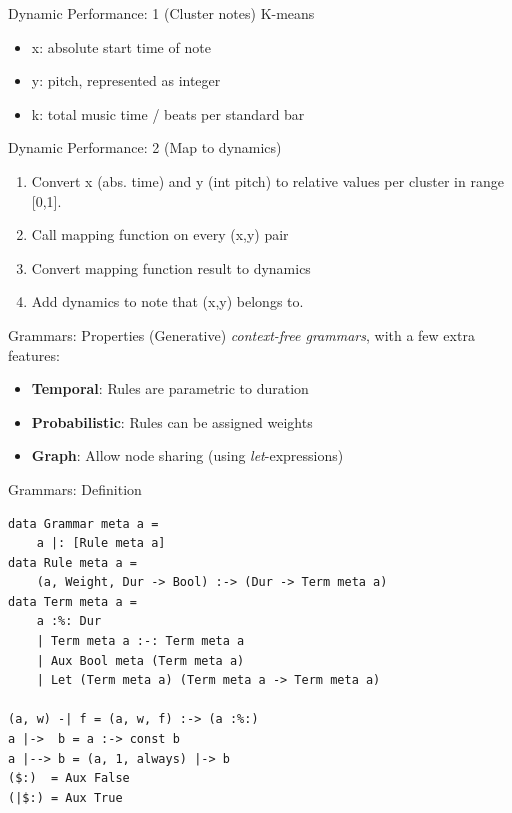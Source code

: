 \documentclass{beamer}
\begin{document}
        \begin{frame}{Dynamic Performance: 1 (Cluster notes)}
                    K-means
                    \begin{itemize}
                    \item x: absolute start time of note
                    \item y: pitch, represented as integer
                    \item k: total music time / beats per standard bar
                    \end{itemize}
        \end{frame}
        
        \begin{frame}{Dynamic Performance: 2 (Map to dynamics)}
                    \begin{enumerate}
                    \item	Convert x (abs. time) and y (int pitch) to relative values per cluster in range [0,1].
                    \item Call mapping function on every (x,y) pair
                    \item Convert mapping function result to dynamics
                    \item Add dynamics to note that (x,y) belongs to.
                    \end{enumerate}
        \end{frame}


	\begin{frame}[fragile=singleslide]{Grammars: Properties}
    (Generative) \textit{context-free grammars}, with a few extra features:
	\begin{itemize}
	\item \textbf{Temporal}: Rules are parametric to duration
	\item \textbf{Probabilistic}: Rules can be assigned weights
	\item \textbf{Graph}: Allow node sharing (using \textit{let}-expressions)
	\end{itemize}
	\end{frame}
	
	\begin{frame}[fragile=singleslide]{Grammars: Definition}
	\begin{verbatim}
data Grammar meta a =
    a |: [Rule meta a]
data Rule meta a =
    (a, Weight, Dur -> Bool) :-> (Dur -> Term meta a)
data Term meta a =
    a :%: Dur
    | Term meta a :-: Term meta a
    | Aux Bool meta (Term meta a)
    | Let (Term meta a) (Term meta a -> Term meta a)

(a, w) -| f = (a, w, f) :-> (a :%:)
a |->  b = a :-> const b
a |--> b = (a, 1, always) |-> b
($:)  = Aux False
(|$:) = Aux True
	\end{verbatim}
	\end{frame}
	
\end{document}
